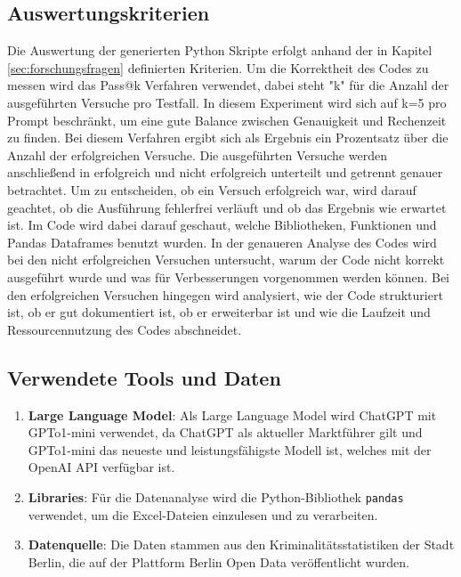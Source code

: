 \documentclass[11pt,a4paper]{article}
\begin{document}
\subsection{Auswertungskriterien}
\label{sec:auswertungskriterien}
    Die Auswertung der generierten Python Skripte erfolgt anhand der in Kapitel \ref{sec:forschungsfragen} definierten Kriterien. Um die Korrektheit des Codes zu messen wird das Pass@k Verfahren verwendet, dabei steht "k" für die Anzahl der ausgeführten Versuche pro Testfall. In diesem Experiment wird sich auf k=5 pro Prompt beschränkt, um eine gute Balance zwischen Genauigkeit und Rechenzeit zu finden. Bei diesem Verfahren ergibt sich als Ergebnis ein Prozentsatz über die Anzahl der erfolgreichen Versuche. Die ausgeführten Versuche werden anschließend in erfolgreich und nicht erfolgreich unterteilt und getrennt genauer betrachtet. Um zu entscheiden, ob ein Versuch erfolgreich war, wird darauf geachtet, ob die Ausführung fehlerfrei verläuft und ob das Ergebnis wie erwartet ist. Im Code wird dabei darauf geschaut, welche Bibliotheken, Funktionen und Pandas Dataframes benutzt wurden.
    In der genaueren Analyse des Codes wird bei den nicht erfolgreichen Versuchen untersucht, warum der Code nicht korrekt ausgeführt wurde und was für Verbesserungen vorgenommen werden können. Bei den erfolgreichen Versuchen hingegen wird analysiert, wie der Code strukturiert ist, ob er gut dokumentiert ist, ob er erweiterbar ist und wie die Laufzeit und Ressourcennutzung des Codes abschneidet.

\subsection{Verwendete Tools und Daten}
    \begin{enumerate}
        \item \textbf{Large Language Model}: Als Large Language Model wird ChatGPT mit GPTo1-mini verwendet, da ChatGPT als aktueller Marktführer gilt und GPTo1-mini das neueste und leistungsfähigste Modell ist, welches mit der OpenAI API verfügbar ist.
        \item \textbf{Libraries}: Für die Datenanalyse wird die Python-Bibliothek \texttt{pandas} verwendet, um die Excel-Dateien einzulesen und zu verarbeiten.
        \item \textbf{Datenquelle}: Die Daten stammen aus den Kriminalitätsstatistiken der Stadt Berlin, die auf der Plattform Berlin Open Data veröffentlicht wurden.
    \end{enumerate}
\end{document}
